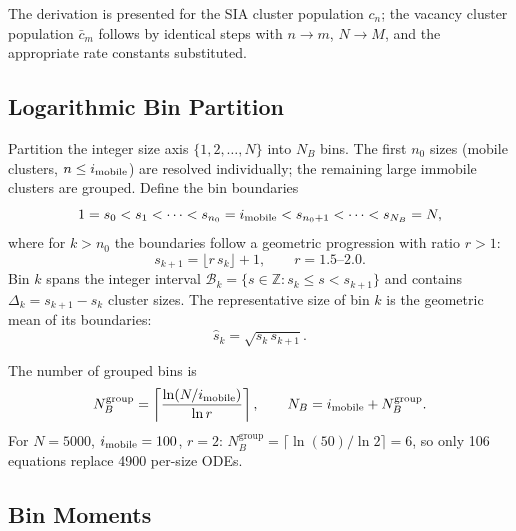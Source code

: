 \documentclass[pdflatex,sn-basic]{sn-jnl} %
\begin{document}
The derivation is presented for the SIA cluster population $c_n$; the
vacancy cluster population $\bar{c}_m$ follows by identical steps with
$n \to m$, $N \to M$, and the appropriate rate constants substituted.

\subsection{Logarithmic Bin Partition}
\label{sec:log_bins}

Partition the integer size axis $\{1, 2, \ldots, N\}$ into $N_B$ bins.
The first $n_0$ sizes (mobile clusters, $n \leq i_{\rm mobile}$) are
resolved individually; the remaining large immobile clusters are
grouped. Define the bin boundaries
\begin{equation}\label{eq:bin_boundaries}
    1 = s_0 < s_1 < \cdots < s_{n_0} = i_{\rm mobile}
    < s_{n_0+1} < \cdots < s_{N_B} = N,
\end{equation}
where for $k > n_0$ the boundaries follow a geometric progression with
ratio $r > 1$:
\begin{equation}\label{eq:bin_ratio}
    s_{k+1} = \lfloor r\,s_k \rfloor + 1,
    \qquad r = 1.5\text{--}2.0.
\end{equation}
Bin $k$ spans the integer interval $\mathcal{B}_k = \{s \in \mathbb{Z}
: s_k \leq s < s_{k+1}\}$ and contains $\Delta_k = s_{k+1} - s_k$
cluster sizes. The representative size of bin $k$ is the geometric
mean of its boundaries:
\begin{equation}\label{eq:shat}
    \hat{s}_k = \sqrt{s_k\,s_{k+1}}.
\end{equation}

The number of grouped bins is
\begin{equation}\label{eq:NB}
    N_B^{\mathrm{group}} = \left\lceil
        \frac{\ln(N/i_{\rm mobile})}{\ln r}
    \right\rceil,
    \qquad
    N_B = i_{\rm mobile} + N_B^{\mathrm{group}}.
\end{equation}
For $N = 5000$, $i_{\rm mobile} = 100$, $r = 2$: $N_B^{\mathrm{group}}
= \lceil \ln(50)/\ln 2 \rceil = 6$, so only 106 equations replace
4900 per-size ODEs.

\subsection{Bin Moments}
\label{sec:bin_moments}
\end{document}
